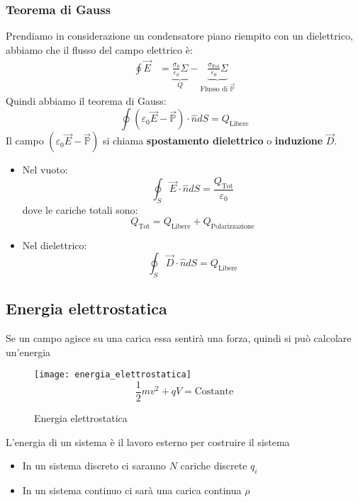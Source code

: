 \documentclass[a4paper]{article}
\begin{document}
\subsubsection{Teorema di Gauss}
Prendiamo in considerazione un condensatore piano riempito con un dielettrico, abbiamo
che il flusso del campo elettrico è:
\[
  \begin{aligned}
    \oint \vec{E} &= \underbrace{\frac{\sigma_0}{\varepsilon_0} \Sigma}_{Q} - 
    \underbrace{\frac{\sigma_{\text{Pol}}}{\varepsilon_0} \Sigma}_{\text{Flusso di } \vec{\mathbb{P}}}
  \end{aligned}
\] 
Quindi abbiamo il teorema di Gauss:
\[
  \oint \left( \varepsilon_0 \vec{E} - \vec{\mathbb{P}} \right) \cdot \hat{n} dS = Q_{\text{Libere}}
\] 
Il campo \( \left( \varepsilon_0 \vec{E} - \vec{\mathbb{P}} \right) \) si chiama 
\textbf{spostamento dielettrico} o \textbf{induzione} \( \vec{D} \).

\begin{itemize}
  \item Nel vuoto:
    \[
      \oint_S \vec{E} \cdot \hat{n} dS = \frac{Q_{\text{Tot}}}{\varepsilon_0}
    \] 
    dove le cariche totali sono:
    \[
      Q_{\text{Tot}} = Q_{\text{Libere}} + Q_{\text{Polarizzazione}}
    \] 

  \item Nel dielettrico:
    \[
      \oint_S \vec{D} \cdot \hat{n} dS = Q_{\text{Libere}}
    \] 
\end{itemize}

\subsection{Energia elettrostatica}
Se un campo agisce su una carica essa sentirà una forza, quindi si può calcolare un'energia
\begin{figure}[H]
  \centering
  \texttt{[image: energia\_elettrostatica]}
  \[
    \frac{1}{2} mv^2 + qV = \text{Costante}
  \] 
  \caption{Energia elettrostatica}
\end{figure}
\begin{definition}
  L'energia di un sistema è il lavoro esterno per costruire il sistema

  \begin{itemize}
    \item In un sistema discreto ci saranno \( N \) cariche discrete \( q_i \) 
    \item In un sistema continuo ci sarà una carica continua \( \rho \) 
  \end{itemize}
\end{definition}
\end{document}
